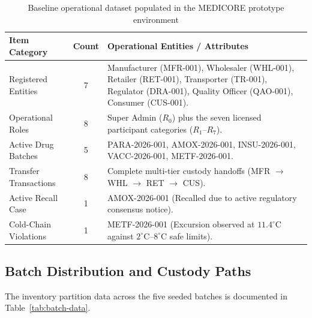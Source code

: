 \documentclass[pdflatex,sn-mathphys-num]{sn-jnl}
\theoremstyle{thmstyleone}
\theoremstyle{thmstyletwo}
\theoremstyle{thmstylethree}
\begin{document}
\begin{table}[htbp]
\centering
\caption{Baseline operational dataset populated in the MEDICORE prototype environment}
\label{tab:dataset-summary}
\vspace{0.5em}
\begin{tabularx}{\textwidth}{lcX}
\toprule
\textbf{Item Category} & \textbf{Count} & \textbf{Operational Entities / Attributes} \\
\midrule
Registered Entities & 7 & Manufacturer (MFR-001), Wholesaler (WHL-001), Retailer (RET-001), Transporter (TR-001), Regulator (DRA-001), Quality Officer (QAO-001), Consumer (CUS-001). \\
Operational Roles & 8 & Super Admin ($R_0$) plus the seven licensed participant categories ($R_1$--$R_7$). \\
Active Drug Batches & 5 & PARA-2026-001, AMOX-2026-001, INSU-2026-001, VACC-2026-001, METF-2026-001. \\
Transfer Transactions & 8 & Complete multi-tier custody handoffs (MFR $\to$ WHL $\to$ RET $\to$ CUS). \\
Active Recall Case & 1 & AMOX-2026-001 (Recalled due to active regulatory consensus notice). \\
Cold-Chain Violations & 1 & METF-2026-001 (Excursion observed at $11.4^\circ\text{C}$ against $2^\circ\text{C}$--$8^\circ\text{C}$ safe limits). \\
\bottomrule
\end{tabularx}
\end{table}

\subsection{Batch Distribution and Custody Paths}

The inventory partition data across the five seeded batches is documented in Table~\ref{tab:batch-data}.
\end{document}
